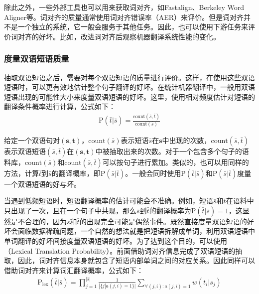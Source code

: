\parinterval 除此之外，一些外部工具也可以用来获取词对齐，如Fastalign\cite{dyer2013a}、Berkeley Word Aligner\cite{taskar2005a}等。词对齐的质量通常使用词对齐错误率（AER）来评价\cite{DBLP:conf/coling/OchN00}。但是词对齐并不是一个独立的系统，它一般会服务于其他任务。因此，也可以使用下游任务来评价词对齐的好坏。比如，改进词对齐后观察机器翻译系统性能的变化。


\subsubsection{度量双语短语质量}

\parinterval 抽取双语短语之后，需要对每个双语短语的质量进行评价。这样，在使用这些双语短语时，可以更有效地估计整个句子翻译的好坏。在统计机器翻译中，一般用双语短语出现的可能性大小来度量双语短语的好坏。这里，使用相对频度估计对短语的翻译条件概率进行计算，公式如下：
\begin{eqnarray}
\textrm{P}(\bar{t}|\bar{s}) = \frac{\textrm{count}(\bar{s},\bar{t})}{\textrm{count}(\bar{s})}
\label{eq:4-13}
\end{eqnarray}

\parinterval 给定一个双语句对$(\mathbf{s},\mathbf{t})$，$\textrm{count}(\bar{s})$表示短语$\bar{s}$在$\mathbf{s}$中出现的次数，$\textrm{count}(\bar{s},\bar{t})$表示双语短语$(\bar{s},\bar{t})$在$(\mathbf{s},\mathbf{t})$中被抽取出来的次数。对于一个包含多个句子的语料库，$\textrm{count}(\bar{s})$和$\textrm{count}(\bar{s},\bar{t})$可以按句子进行累加。类似的，也可以用同样的方法，计算$\bar{t}$到$\bar{s}$的翻译概率，即$\textrm{P}(\bar{s}|\bar{t})$。一般会同时使用$\textrm{P}(\bar{t}|\bar{s})$和$\textrm{P}(\bar{s}|\bar{t})$度量一个双语短语的好与坏。

\parinterval 当遇到低频短语时，短语翻译概率的估计可能会不准确。例如，短语$\bar{s}$和$\bar{t}$在语料中只出现了一次，且在一个句子中共现，那么$\bar{s}$到$\bar{t}$的翻译概率为$\textrm{P}(\bar{t}|\bar{s})=1$，这显然是不合理的，因为$\bar{s}$和$\bar{t}$的出现完全可能是偶然事件。既然直接度量双语短语的好坏会面临数据稀疏问题，一个自然的想法就是把短语拆解成单词，利用双语短语中单词翻译的好坏间接度量双语短语的好坏。为了达到这个目的，可以使用{\small{}}（Lexical Translation Probability）。前面借助词对齐信息完成了双语短语的抽取，因此，词对齐信息本身就包含了短语内部单词之间的对应关系。因此同样可以借助词对齐来计算词汇翻译概率，公式如下：
\begin{eqnarray}
\textrm{$\textrm{P}_{\textrm{lex}}$}(\bar{t}|\bar{s}) = \prod_{j=1}^{|\bar{s}|} \frac{1}{|\{j|a(j,i) = 1\}|} \sum_{\forall(j,i):a(j,i) = 1} w(t_i|s_j)
\label{eq:4-14}
\end{eqnarray}

